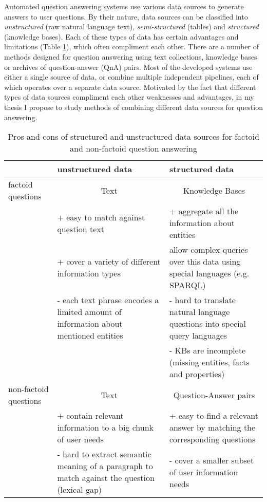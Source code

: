 Automated question answering systems use various data sources to generate answers to user questions.
By their nature, data sources can be classified into \textit{unstructured} (\eg raw natural language text), \textit{semi-structured} (\eg tables) and \textit{structured} (\eg knowledge bases).
Each of these types of data has certain advantages and limitations (Table \ref{table:data_procons}), which often compliment each other.
There are a number of methods designed for question answering using text collections, knowledge bases or archives of question-answer (QnA) pairs.
Most of the developed systems use either a single source of data, or combine multiple independent pipelines, each of which operates over a separate data source.
Motivated by the fact that different types of data sources compliment each other weaknesses and advantages, in my thesis I propose to study methods of combining different data sources for question answering.

\begin{table}
\centering
\caption{Pros and cons of structured and unstructured data sources for factoid and non-factoid question answering}
\begin{tabular}{| l | p{6cm} | p{6cm} |}
\hline
 & unstructured data & structured data \\
\hline
factoid questions & \multicolumn{1}{|c|}{Text} & \multicolumn{1}{|c|}{Knowledge Bases} \\
 & + easy to match against question text & + aggregate all the information about entities\\
 & + cover a variety of different information types & allow complex queries over this data using special languages (e.g. SPARQL) \\
 & - each text phrase encodes a limited amount of information about mentioned entities & - hard to translate natural language questions into special query languages \\
&  & - KBs are incomplete (missing entities, facts and properties) \\
\hline
non-factoid questions & \multicolumn{1}{|c|}{Text} & \multicolumn{1}{|c|}{Question-Answer pairs} \\
 & + contain relevant information to a big chunk of user needs & + easy to find a relevant answer by matching the corresponding questions \\
 & - hard to extract semantic meaning of a paragraph to match against the question (lexical gap) & - cover a smaller subset of user information needs \\
\hline
\end{tabular}
\label{table:data_procons}
\end{table}

